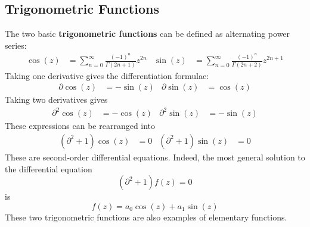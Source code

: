 \subsection{Trigonometric Functions}
The two basic \textbf{trigonometric functions} can be defined as alternating power series:
\begin{align}
    \cos(z) &= \sum_{n = 0}^{\infty} \frac{(-1)^{n}}{\Gamma(2n + 1)} z^{2n} & \sin(z) &= \sum_{n = 0}^{\infty} \frac{(-1)^{n}}{\Gamma(2n + 2)} z^{2n + 1}
\end{align}
Taking one derivative gives the differentiation formulae:
\begin{align}
    \partial \cos(z) &= -\sin(z) & \partial \sin(z) &= \cos(z)
\end{align}
Taking two derivatives gives
\begin{align}
    \partial^{2} \cos(z) &= -\cos(z) & \partial^{2} \sin(z) &= -\sin(z)
\end{align}
These expressions can be rearranged into
\begin{align}
    \left( \partial^{2} + 1 \right) \cos(z) &= 0 & \left( \partial^{2} + 1 \right) \sin(z) &= 0
\end{align}
These are second-order differential equations. Indeed, the most general solution to the differential equation
\begin{equation}
    \left( \partial^{2} + 1 \right) f(z) = 0
\end{equation}
is
\begin{equation}
    f(z) = a_{0} \cos(z) + a_{1} \sin(z)
\end{equation}
These two trigonometric functions are also examples of elementary functions.
